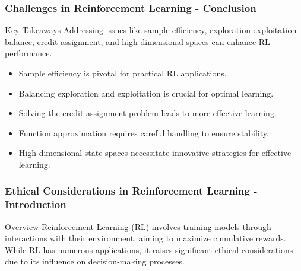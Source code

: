 \documentclass[aspectratio=169]{beamer}
\begin{document}
\begin{frame}[fragile]
    \frametitle{Challenges in Reinforcement Learning - Conclusion}
    \begin{block}{Key Takeaways}
        Addressing issues like sample efficiency, exploration-exploitation balance, credit assignment, and high-dimensional spaces can enhance RL performance.
    \end{block}
    \begin{itemize}
        \item Sample efficiency is pivotal for practical RL applications.
        \item Balancing exploration and exploitation is crucial for optimal learning.
        \item Solving the credit assignment problem leads to more effective learning.
        \item Function approximation requires careful handling to ensure stability.
        \item High-dimensional state spaces necessitate innovative strategies for effective learning.
    \end{itemize}
\end{frame}

\begin{frame}[fragile]
    \frametitle{Ethical Considerations in Reinforcement Learning - Introduction}
    \begin{block}{Overview}
        Reinforcement Learning (RL) involves training models through interactions with their environment, 
        aiming to maximize cumulative rewards. While RL has numerous applications, it raises significant 
        ethical considerations due to its influence on decision-making processes.
    \end{block}
\end{frame}
\end{document}
